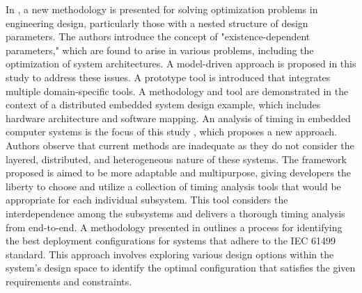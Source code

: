 In \cite{zimmermann2018optimization}, a new methodology is presented for solving optimization problems in engineering design, particularly those with a nested structure of design parameters. The authors introduce the concept of "existence-dependent parameters," which are found to arise in various problems, including the optimization of system architectures. 
A model-driven approach is proposed in this study to address these issues. A prototype tool is introduced that integrates multiple domain-specific tools. A methodology and tool are demonstrated in the context of a distributed embedded system design example, which includes hardware architecture and software mapping.
An analysis of timing in embedded computer systems is the focus of this study \cite{7336300}, which proposes a new approach. Authors observe that current methods are inadequate as they do not consider the layered, distributed, and heterogeneous nature of these systems.
The framework proposed is aimed to be more adaptable and multipurpose, giving developers the liberty to choose and utilize a collection of timing analysis tools that would be appropriate for each individual subsystem. This tool considers the interdependence among the subsystems and delivers a thorough timing analysis from end-to-end.
A methodology presented in \cite{8560591} outlines a process for identifying the best deployment configurations for systems that adhere to the IEC 61499 standard. This approach involves exploring various design options within the system's design space to identify the optimal configuration that satisfies the given requirements and constraints.
